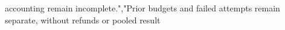 \documentclass[10pt]{article}
\begin{document}
\allowbreak{}a\allowbreak{}c\allowbreak{}c\allowbreak{}o\allowbreak{}u\allowbreak{}n\allowbreak{}t\allowbreak{}i\allowbreak{}n\allowbreak{}g\allowbreak{} \allowbreak{}r\allowbreak{}e\allowbreak{}m\allowbreak{}a\allowbreak{}i\allowbreak{}n\allowbreak{} \allowbreak{}i\allowbreak{}n\allowbreak{}c\allowbreak{}o\allowbreak{}m\allowbreak{}p\allowbreak{}l\allowbreak{}e\allowbreak{}t\allowbreak{}e\allowbreak{}.\allowbreak{}"\allowbreak{},\allowbreak{}"\allowbreak{}P\allowbreak{}r\allowbreak{}i\allowbreak{}o\allowbreak{}r\allowbreak{} \allowbreak{}b\allowbreak{}u\allowbreak{}d\allowbreak{}g\allowbreak{}e\allowbreak{}t\allowbreak{}s\allowbreak{} \allowbreak{}a\allowbreak{}n\allowbreak{}d\allowbreak{} \allowbreak{}f\allowbreak{}a\allowbreak{}i\allowbreak{}l\allowbreak{}e\allowbreak{}d\allowbreak{} \allowbreak{}a\allowbreak{}t\allowbreak{}t\allowbreak{}e\allowbreak{}m\allowbreak{}p\allowbreak{}t\allowbreak{}s\allowbreak{} \allowbreak{}r\allowbreak{}e\allowbreak{}m\allowbreak{}a\allowbreak{}i\allowbreak{}n\allowbreak{} \allowbreak{}s\allowbreak{}e\allowbreak{}p\allowbreak{}a\allowbreak{}r\allowbreak{}a\allowbreak{}t\allowbreak{}e\allowbreak{},\allowbreak{} \allowbreak{}w\allowbreak{}i\allowbreak{}t\allowbreak{}h\allowbreak{}o\allowbreak{}u\allowbreak{}t\allowbreak{} \allowbreak{}r\allowbreak{}e\allowbreak{}f\allowbreak{}u\allowbreak{}n\allowbreak{}d\allowbreak{}s\allowbreak{} \allowbreak{}o\allowbreak{}r\allowbreak{} \allowbreak{}p\allowbreak{}o\allowbreak{}o\allowbreak{}l\allowbreak{}e\allowbreak{}d\allowbreak{} \allowbreak{}r\allowbreak{}e\allowbreak{}s\allowbreak{}u\allowbreak{}l\allowbreak{}t\allowbreak{} 
\end{document}
